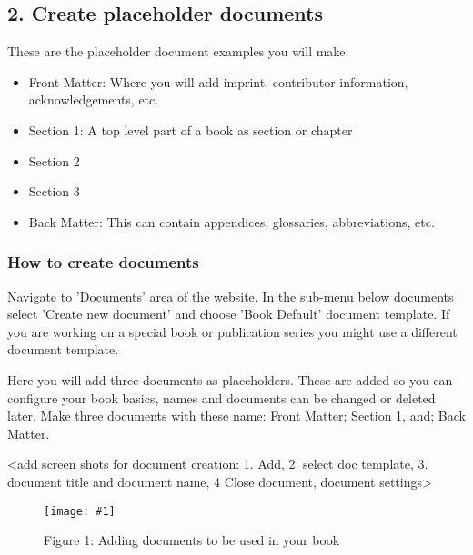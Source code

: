 \documentclass{article}
\newlength{\imgwidth}
\newcommand\scaledgraphics[2]{%
                
\settowidth{\imgwidth}{\texttt{[image: \#1]}}%
                
\setlength{\imgwidth}{\minof{\imgwidth}{#2\textwidth}}%
                
\texttt{[image: \#1]}%
                
}
\begin{document}
\subsection{2. Create placeholder documents }\label{H8214025}



These are the placeholder document examples you will make:

\begin{itemize}
\item Front Matter: Where you will add imprint, contributor information, acknowledgements, etc.


\item Section 1: A top level part of a book as section or chapter


\item Section 2


\item Section 3


\item Back Matter: This can contain appendices, glossaries, abbreviations, etc.


\end{itemize}

\subsubsection{How to create documents}\label{H7006285}



Navigate to 'Documents' area of the website. In the sub-menu below documents select 'Create new document' and choose 'Book Default' document template. If you are working on a special book or publication series you might use a different document template.


Here you will add three documents as placeholders. These are added so you can configure your book basics, names and documents can be changed or deleted later. Make three documents with these name: Front Matter; Section 1, and; Back Matter.


<add screen shots for document creation: 1. Add, 2. select doc template, 3. document title and document name, 4 Close document, document settings>

\begin{figure}
\scaledgraphics{9e5d1d14-244e-4d55-b1f9-effb37b619e9.png}{1}
\caption*{Figure 1: Adding documents to be used in your book}\label{F35194901}
\end{figure}
\end{document}
